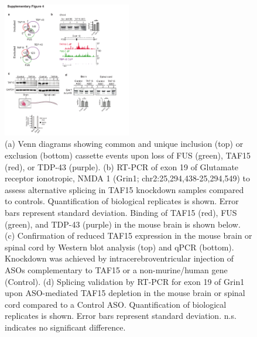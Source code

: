 \begin{figure}[ht]
  \centering
  \includegraphics[width=0.5\textwidth]{chapter_2_figures/Figure_S4}
  \caption[Supplementary Figure 4. Effect of TAF15 depletion on alternative splicing]{(a) Venn diagrams showing common and unique inclusion (top) or exclusion (bottom) cassette events upon loss of FUS (green), TAF15 (red), or TDP-43 (purple). (b) RT-PCR of exon 19 of Glutamate receptor ionotropic, NMDA 1 (Grin1; chr2:25,294,438-25,294,549) to assess alternative splicing in TAF15 knockdown samples compared to controls. Quantification of biological replicates is shown. Error bars represent standard deviation. Binding of TAF15 (red), FUS (green), and TDP-43 (purple) in the mouse brain is shown below. (c) Confirmation of reduced TAF15 expression in the mouse brain or spinal cord by Western blot analysis (top) and qPCR (bottom). Knockdown was achieved by intracerebroventricular injection of ASOs complementary to TAF15 or a non-murine/human gene (Control). (d) Splicing validation by RT-PCR for exon 19 of Grin1 upon ASO-mediated TAF15 depletion in the mouse brain or spinal cord compared to a Control ASO. Quantification of biological replicates is shown. Error bars represent standard deviation. n.s. indicates no significant difference.}
  \label{fig:Figure_S4}
\end{figure}

